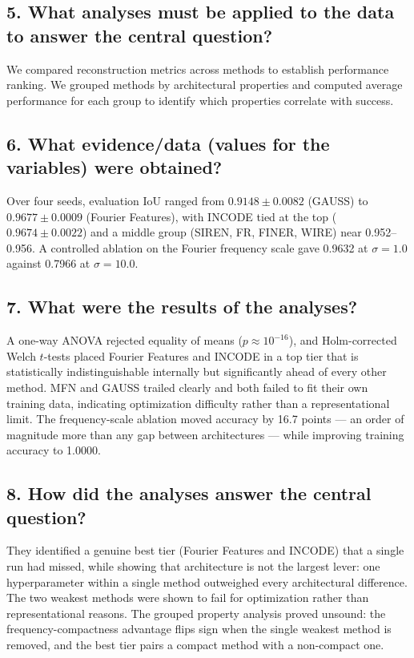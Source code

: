 \subsection*{5. What analyses must be applied to the data to answer the central question?}
We compared reconstruction metrics across methods to establish performance ranking. We grouped methods by architectural properties and computed average performance for each group to identify which properties correlate with success.

\subsection*{6. What evidence/data (values for the variables) were obtained?}
Over four seeds, evaluation IoU ranged from $0.9148 \pm 0.0082$ (GAUSS) to $0.9677 \pm 0.0009$ (Fourier Features), with INCODE tied at the top ($0.9674 \pm 0.0022$) and a middle group (SIREN, FR, FINER, WIRE) near 0.952--0.956. A controlled ablation on the Fourier frequency scale gave 0.9632 at $\sigma = 1.0$ against 0.7966 at $\sigma = 10.0$.

\subsection*{7. What were the results of the analyses?}
A one-way ANOVA rejected equality of means ($p \approx 10^{-16}$), and Holm-corrected Welch $t$-tests placed Fourier Features and INCODE in a top tier that is statistically indistinguishable internally but significantly ahead of every other method. MFN and GAUSS trailed clearly and both failed to fit their own training data, indicating optimization difficulty rather than a representational limit. The frequency-scale ablation moved accuracy by 16.7 points --- an order of magnitude more than any gap between architectures --- while improving training accuracy to 1.0000.

\subsection*{8. How did the analyses answer the central question?}
They identified a genuine best tier (Fourier Features and INCODE) that a single run had missed, while showing that architecture is not the largest lever: one hyperparameter within a single method outweighed every architectural difference. The two weakest methods were shown to fail for optimization rather than representational reasons. The grouped property analysis proved unsound: the frequency-compactness advantage flips sign when the single weakest method is removed, and the best tier pairs a compact method with a non-compact one.

